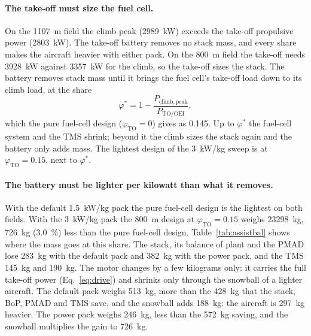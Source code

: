 \documentclass[a4paper,11pt]{article}
\begin{document}
\paragraph{The take-off must size the fuel cell.} On the \SI{1107}{m} field the climb peak
(\SI{2989}{kW}) exceeds the take-off propulsive power (\SI{2803}{kW}). The take-off battery
removes no stack mass, and every share makes the aircraft heavier with either pack. On the
\SI{800}{m} field the take-off needs \SI{3928}{kW} against \SI{3357}{kW} for the climb, so the
take-off sizes the stack. The battery removes stack mass until it brings the fuel cell's
take-off load down to its climb load, at the share
\begin{equation}
  \varphi^* = 1 - \frac{P_\mathrm{climb,peak}}{P_\mathrm{TO/OEI}} ,
  \label{eq:phistar}
\end{equation}
which the pure fuel-cell design ($\varphi_\mathrm{TO}=0$) gives as 0.145. Up to $\varphi^*$ the
fuel-cell system and the TMS shrink; beyond it the climb sizes the stack again and the battery
only adds mass. The lightest design of the \SI{3}{kW/kg} sweep is at $\varphi_\mathrm{TO}=0.15$,
next to $\varphi^*$.

\paragraph{The battery must be lighter per kilowatt than what it removes.} With the default
\SI{1.5}{kW/kg} pack the pure fuel-cell design is the lightest on both fields. With the
\SI{3}{kW/kg} pack the \SI{800}{m} design at $\varphi_\mathrm{TO}=0.15$ weighs \SI{23298}{kg},
\SI{726}{kg} (\SI{3.0}{\percent}) less than the pure fuel-cell design. Table~\ref{tab:assistbal}
shows where the mass goes at this share. The stack, its balance of plant and the PMAD lose
\SI{283}{kg} with the default pack and \SI{382}{kg} with the power pack, and the TMS \SI{145}{kg}
and \SI{190}{kg}. The motor changes by a few kilograms only: it carries the full take-off power
(Eq.~\eqref{eq:drive}) and shrinks only through the snowball of a lighter aircraft. The default
pack weighs \SI{513}{kg}, more than the \SI{428}{kg} that the stack, BoP, PMAD and TMS save, and
the snowball adds \SI{188}{kg}: the aircraft is \SI{297}{kg} heavier. The power pack weighs
\SI{246}{kg}, less than the \SI{572}{kg} saving, and the snowball multiplies the gain to
\SI{726}{kg}.
\end{document}
